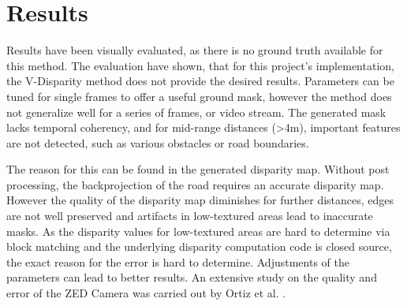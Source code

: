 
\chapter{Results}
\label{chp:Results}

Results have been visually evaluated, as there is no ground truth available for this method. 
The evaluation have shown, that for this project's implementation, the V-Disparity method does not provide the desired results. Parameters can be tuned for single frames to offer a useful ground mask, however the method does not generalize well for a series of frames, or video stream. The generated mask lacks temporal coherency, and for mid-range distances (>4m), important features are not detected, such as various obstacles or road boundaries. 

\newline
The reason for this can be found in the generated disparity map. Without post processing, the backprojection of the road requires an accurate disparity map. However the quality of the disparity map diminishes for further distances, edges are not well preserved and artifacts in low-textured areas lead to inaccurate masks. As the disparity values for low-textured areas are hard to determine via block matching and the underlying disparity computation code is closed source, the exact reason for the error is hard to determine. 
\newline
Adjustments of the parameters can lead to better results. An extensive study on the quality and error of the ZED Camera was carried out by Ortiz et al. \cite{Ortiz2018}.